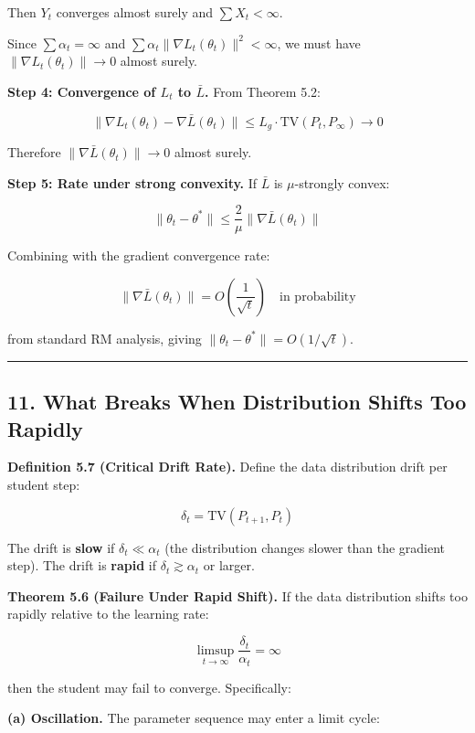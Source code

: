 \documentclass[
  12pt,
]{article}
\begin{document}
Then \(Y_t\) converges almost surely and \(\sum X_t < \infty\).

Since \(\sum \alpha_t = \infty\) and
\(\sum \alpha_t \|\nabla L_t(\theta_t)\|^2 < \infty\), we must have
\(\|\nabla L_t(\theta_t)\| \to 0\) almost surely.

\textbf{Step 4: Convergence of \(L_t\) to \(\bar{L}\).} From Theorem
5.2:

\[
\|\nabla L_t(\theta_t) - \nabla \bar{L}(\theta_t)\| \leq L_g \cdot \text{TV}(P_t, P_\infty) \to 0
\]

Therefore \(\|\nabla \bar{L}(\theta_t)\| \to 0\) almost surely.

\textbf{Step 5: Rate under strong convexity.} If \(\bar{L}\) is
\(\mu\)-strongly convex:

\[
\|\theta_t - \theta^*\| \leq \frac{2}{\mu} \|\nabla \bar{L}(\theta_t)\|
\]

Combining with the gradient convergence rate:

\[
\|\nabla \bar{L}(\theta_t)\| = O\left(\frac{1}{\sqrt{t}}\right) \quad \text{in probability}
\]

from standard RM analysis, giving
\(\|\theta_t - \theta^*\| = O(1/\sqrt{t})\).

\begin{center}\rule{0.5\linewidth}{0.5pt}\end{center}

\subsection{11. What Breaks When Distribution Shifts Too
Rapidly}\label{what-breaks-when-distribution-shifts-too-rapidly}

\textbf{Definition 5.7 (Critical Drift Rate).} Define the data
distribution drift per student step:

\[
\delta_t = \text{TV}(P_{t+1}, P_t)
\]

The drift is \textbf{slow} if \(\delta_t \ll \alpha_t\) (the
distribution changes slower than the gradient step). The drift is
\textbf{rapid} if \(\delta_t \gtrsim \alpha_t\) or larger.

\textbf{Theorem 5.6 (Failure Under Rapid Shift).} If the data
distribution shifts too rapidly relative to the learning rate:

\[
\limsup_{t \to \infty} \frac{\delta_t}{\alpha_t} = \infty
\]

then the student may fail to converge. Specifically:

\textbf{(a) Oscillation.} The parameter sequence may enter a limit
cycle:
\end{document}
